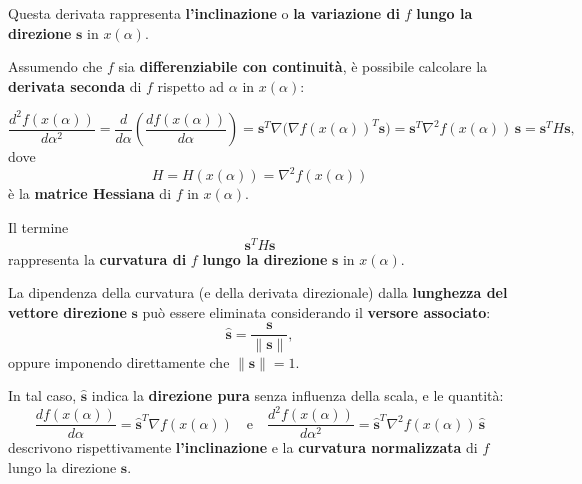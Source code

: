 Questa derivata rappresenta \textbf{l’inclinazione} o \textbf{la variazione di} $f$ \textbf{lungo la direzione} $\mathbf{s}$ in $x(\alpha)$.

Assumendo che $f$ sia \textbf{differenziabile con continuità}, è possibile calcolare la \textbf{derivata seconda} di $f$ rispetto ad $\alpha$ in $x(\alpha)$:

\[
\frac{d^2 f(x(\alpha))}{d\alpha^2}
= \frac{d}{d\alpha} \left( \frac{d f(x(\alpha))}{d\alpha} \right)
= \mathbf{s}^T \nabla \big( \nabla f(x(\alpha))^T \mathbf{s} \big)
= \mathbf{s}^T \nabla^2 f(x(\alpha)) \, \mathbf{s}
= \mathbf{s}^T H \mathbf{s},
\]
dove 
\[
H = H(x(\alpha)) = \nabla^2 f(x(\alpha))
\]
è la \textbf{matrice Hessiana} di $f$ in $x(\alpha)$.

Il termine 
\[
\mathbf{s}^T H \mathbf{s}
\]
rappresenta la \textbf{curvatura di} $f$ \textbf{lungo la direzione} $\mathbf{s}$ in $x(\alpha)$.

La dipendenza della curvatura (e della derivata direzionale) dalla \textbf{lunghezza del vettore direzione} $\mathbf{s}$ può essere eliminata considerando il \textbf{versore associato}:
\[
\hat{\mathbf{s}} = \frac{\mathbf{s}}{\|\mathbf{s}\|},
\]
oppure imponendo direttamente che $\|\mathbf{s}\| = 1$.

In tal caso, $\hat{\mathbf{s}}$ indica la \textbf{direzione pura} senza influenza della scala, e le quantità:
\[
\frac{d f(x(\alpha))}{d\alpha} = \hat{\mathbf{s}}^T \nabla f(x(\alpha))
\quad \text{e} \quad
\frac{d^2 f(x(\alpha))}{d\alpha^2} = \hat{\mathbf{s}}^T \nabla^2 f(x(\alpha)) \, \hat{\mathbf{s}}
\]
descrivono rispettivamente \textbf{l’inclinazione} e la \textbf{curvatura normalizzata} di $f$ lungo la direzione $\hat{\mathbf{s}}$.

